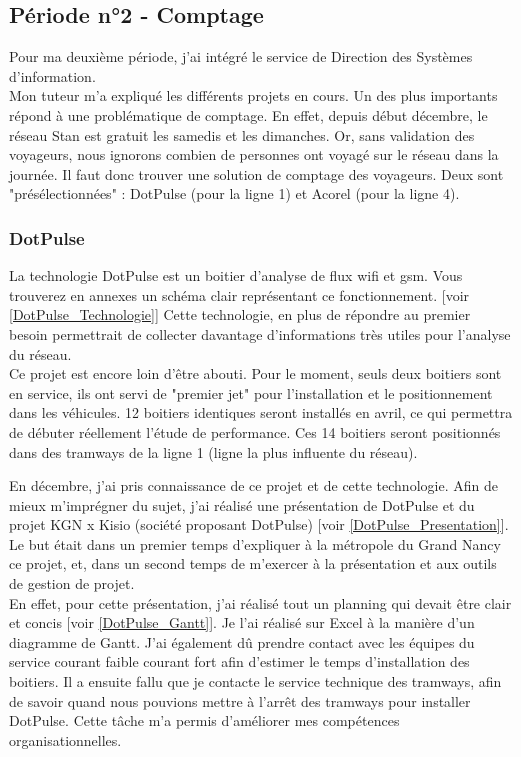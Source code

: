 \documentclass{article}
\begin{document}
    \subsection{Période n°2 - Comptage}
        Pour ma deuxième période, j'ai intégré le service de Direction des 
        Systèmes d'information.\\
        Mon tuteur m'a expliqué les différents projets en cours. Un des plus 
        importants répond à une problématique de comptage. En effet, depuis début
        décembre, le réseau Stan est gratuit les samedis et les dimanches. Or, 
        sans validation des voyageurs, nous ignorons combien de personnes ont 
        voyagé sur le réseau dans la journée. Il faut donc trouver une
        solution de comptage des voyageurs. Deux sont "présélectionnées" :
        DotPulse (pour la ligne 1) et Acorel (pour la ligne 4).

        \subsubsection{DotPulse}
        La technologie DotPulse est un boitier d'analyse de flux wifi et gsm. 
        Vous trouverez en annexes un schéma clair représentant ce fonctionnement. 
        [voir \ref{DotPulse_Technologie}] Cette technologie, en plus de répondre 
        au premier besoin permettrait de collecter davantage d'informations très utiles pour 
        l'analyse du réseau.\\
        Ce projet est encore loin d'être abouti. Pour le moment, seuls deux boitiers 
        sont en service, ils ont servi de "premier jet" pour l'installation et le positionnement
        dans les véhicules. 12 boitiers identiques seront installés en avril, ce qui permettra 
        de débuter réellement l'étude de performance. Ces 14 boitiers seront positionnés dans des tramways
        de la ligne 1 (ligne la plus influente du réseau).

        En décembre, j'ai pris connaissance de ce projet et de cette technologie. Afin 
        de mieux m'imprégner du sujet, j'ai réalisé une présentation de DotPulse 
        et du projet KGN x Kisio (société proposant DotPulse) [voir \ref{DotPulse_Presentation}]. Le but était dans 
        un premier temps d'expliquer à la métropole du Grand Nancy ce projet, et, dans un 
        second temps de m'exercer à la présentation et aux outils de gestion de projet.\\
        En effet, pour cette présentation, j'ai réalisé tout un planning qui devait 
        être clair et concis [voir \ref{DotPulse_Gantt}]. Je l'ai réalisé sur Excel à la manière d'un diagramme de Gantt.
        J'ai également dû prendre contact avec les équipes du service courant faible courant
        fort afin d'estimer le temps d'installation des boitiers. Il a ensuite fallu que je
        contacte le service technique des tramways, afin de savoir quand nous pouvions mettre 
        à l'arrêt des tramways pour installer DotPulse. Cette tâche m'a permis d'améliorer mes 
        compétences organisationnelles.
\end{document}
